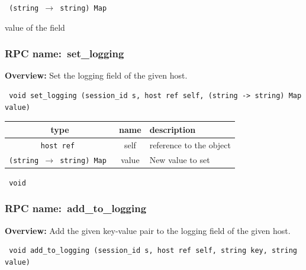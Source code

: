 \vspace{0.3cm}

{\tt 
(string $\rightarrow$ string) Map
}


value of the field
\vspace{0.3cm}
\vspace{0.3cm}
\vspace{0.3cm}
\subsubsection{RPC name:~set\_logging}

{\bf Overview:} 
Set the logging field of the given host.

\begin{verbatim} void set_logging (session_id s, host ref self, (string -> string) Map value)\end{verbatim}



 
\vspace{0.3cm}
\begin{tabular}{|c|c|p{7cm}|}
 \hline
{\bf type} & {\bf name} & {\bf description} \\ \hline
{\tt host ref } & self & reference to the object \\ \hline 

{\tt (string $\rightarrow$ string) Map } & value & New value to set \\ \hline 

\end{tabular}

\vspace{0.3cm}

{\tt 
void
}



\vspace{0.3cm}
\vspace{0.3cm}
\vspace{0.3cm}
\subsubsection{RPC name:~add\_to\_logging}

{\bf Overview:} 
Add the given key-value pair to the logging field of the given host.

\begin{verbatim} void add_to_logging (session_id s, host ref self, string key, string value)\end{verbatim}



